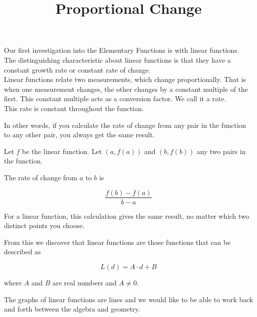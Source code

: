 \documentclass{ximera}
\title{Proportional Change}
\begin{document}
\begin{abstract}
\end{abstract}
\maketitle









Our first investigation into the Elementary Functions is with linear functions. The distinguishing characteristic about linear functions is that they have a constant growth rate or constant rate of change.  \\




Linear functions relate two measurements, which change proportionally.  That is when one measurement changes, the other changes by a constant multiple of the first.  This constant multiple acts as a conversion factor.  We call it a rate. \\



This rate is constant throughout the function.





In other words, if you calculate the rate of change from any pair in the function to any other pair, you always get the same result.

Let $f$ be the linear function.  Let $(a, f(a))$ and $(b, f(b))$ any two pairs in the function.

The rate of change from $a$ to $b$ is 

\[
\frac{f(b) - f(a)}{b-a}
\]


For a linear function, this calculation gives the same result, no matter which two distinct points you choose.













From this we discover that linear functions are those functions that can be described as

\[  L(d) = A \cdot d + B \]

where $A$ and $B$ are real numbers and $A \ne 0$.


The graphs of linear functions are lines and we would like to be able to work back and forth between the algebra and geometry.
\end{document}
